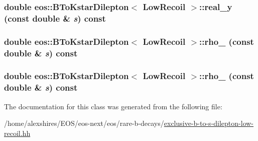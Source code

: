 \hypertarget{classeos_1_1BToKstarDilepton_3_01LowRecoil_01_4_a6885b78b5b1c62716b75254ef737ec8a}{
\subsubsection[{real\_\-y}]{\setlength{\rightskip}{0pt plus 5cm}double eos::BToKstarDilepton$<$ {\bf LowRecoil} $>$::real\_\-y (const double \& {\em s}) const}}
\label{classeos_1_1BToKstarDilepton_3_01LowRecoil_01_4_a6885b78b5b1c62716b75254ef737ec8a}
\hypertarget{classeos_1_1BToKstarDilepton_3_01LowRecoil_01_4_a94a9b9aac31a8e291f69b106cdc466ed}{
\subsubsection[{rho\_\-1}]{\setlength{\rightskip}{0pt plus 5cm}double eos::BToKstarDilepton$<$ {\bf LowRecoil} $>$::rho\_ (const double \& {\em s}) const}}
\label{classeos_1_1BToKstarDilepton_3_01LowRecoil_01_4_a94a9b9aac31a8e291f69b106cdc466ed}
\hypertarget{classeos_1_1BToKstarDilepton_3_01LowRecoil_01_4_a358c56df174296e11561ab993f5f1b95}{
\subsubsection[{rho\_\-2}]{\setlength{\rightskip}{0pt plus 5cm}double eos::BToKstarDilepton$<$ {\bf LowRecoil} $>$::rho\_ (const double \& {\em s}) const}}
\label{classeos_1_1BToKstarDilepton_3_01LowRecoil_01_4_a358c56df174296e11561ab993f5f1b95}


The documentation for this class was generated from the following file:\begin{DoxyCompactItemize}
\item 
/home/alexshires/EOS/eos-\/next/eos/rare-\/b-\/decays/\hyperlink{exclusive-b-to-s-dilepton-low-recoil_8hh}{exclusive-\/b-\/to-\/s-\/dilepton-\/low-\/recoil.hh}\end{DoxyCompactItemize}
